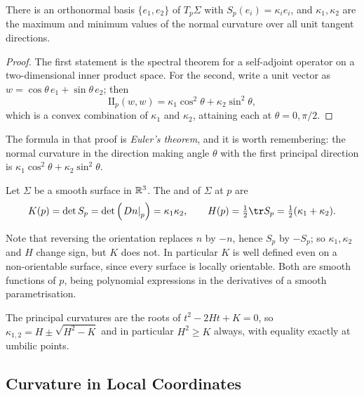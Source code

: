 \documentclass[a4paper]{scrartcl}
\begin{document}
\begin{corollary}
    There is an orthonormal basis $\{e_1, e_2\}$ of $T_p\Sigma$ with $S_p(e_i) = \kappa_i e_i$, and $\kappa_1, \kappa_2$ are the maximum and minimum values of the normal curvature over all unit tangent directions.
\end{corollary}
\begin{proof}
    The first statement is the spectral theorem for a self-adjoint operator on a two-dimensional inner product space. For the second, write a unit vector as $w = \cos\theta \, e_1 + \sin\theta \, e_2$; then
    $$
    \mathrm{II}_p(w, w) = \kappa_1 \cos^2\theta + \kappa_2\sin^2\theta,
    $$
    which is a convex combination of $\kappa_1$ and $\kappa_2$, attaining each at $\theta = 0, \pi/2$.
\end{proof}

The formula in that proof is \emph{Euler's theorem}, and it is worth remembering: the normal curvature in the direction making angle $\theta$ with the first principal direction is $\kappa_1 \cos^2\theta + \kappa_2\sin^2\theta$.

\begin{definition}
    Let $\Sigma$ be a smooth surface in $\mathbb{R}^3$. The  and  of $\Sigma$ at $p$ are
    $$
    K(p) = \det S_p = \det\left(\left.Dn\right|_p\right) = \kappa_1\kappa_2, \qquad H(p) = \tfrac{1}{2}\tr S_p = \tfrac{1}{2}(\kappa_1 + \kappa_2).
    $$
\end{definition}

Note that reversing the orientation replaces $n$ by $-n$, hence $S_p$ by $-S_p$; so $\kappa_1, \kappa_2$ and $H$ change sign, but $K$ does not. In particular $K$ is well defined even on a non-orientable surface, since every surface is locally orientable. Both are smooth functions of $p$, being polynomial expressions in the derivatives of a smooth parametrisation.

\begin{remark}
    The principal curvatures are the roots of $t^2 - 2Ht + K = 0$, so $\kappa_{1,2} = H \pm \sqrt{H^2-K}$ and in particular $H^2 \geq K$ always, with equality exactly at umbilic points.
\end{remark}

\subsection{Curvature in Local Coordinates}
\end{document}
